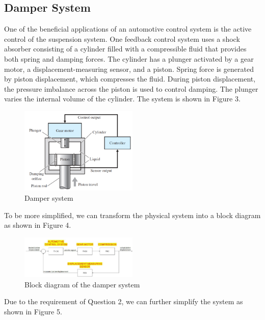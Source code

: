 \documentclass{article}
\begin{document}
\subsection{Damper System}

One of the beneficial applications of an automotive control system is the active control of the suspension system. 
One feedback control system uses a shock absorber consisting of a cylinder filled with a compressible fluid that provides both spring and damping forces. 
The cylinder has a plunger activated by a gear motor,
a displacement-measuring sensor, and a piston. 
Spring force is generated by piston displacement, 
which compresses the fluid. During piston displacement, 
the pressure imbalance across the piston is used to control damping. 
The plunger varies the internal volume of the cylinder.
The system is shown in Figure 3.\\

\begin{figure}[htbp]
    \centering
    \includegraphics[width=0.5\textwidth]{4.jpg}
    \caption{Damper system}
\end{figure}

To be more simplified, we can transform the physical system into a block diagram as shown in Figure 4.\\

\begin{figure}[htbp]
    \centering
    \includegraphics[width=0.5\textwidth]{5.jpg}
    \caption{Block diagram of the damper system}
\end{figure}

Due to the requirement of Question 2, we can further simplify the system as shown in Figure 5.\\
\end{document}
